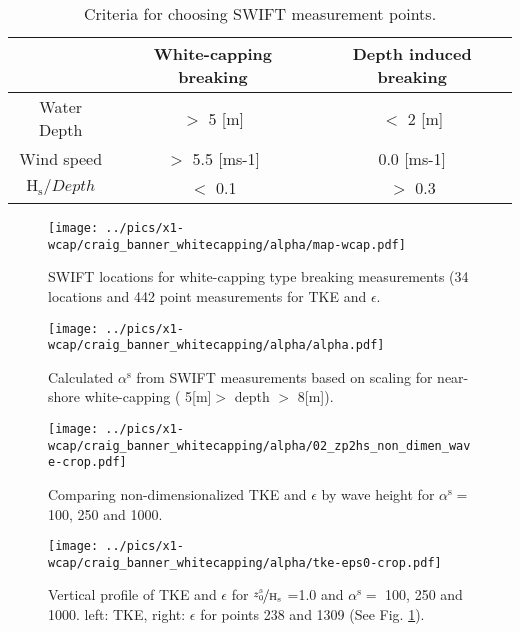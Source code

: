 \documentclass[final]{svjour3}
\begin{document}
\begin{table}
 \begin{center}
   \caption{Criteria for choosing SWIFT measurement points.}
   \label{tab:wcap_points}
   \begin{tabular}{c c c}
    \hline
        &  White-capping breaking         &  Depth induced breaking   \\ \hline 
        Water Depth      &  $>$ 5 [m]       &    $<$ 2 [m]             \\
        Wind speed       &  $>$ 5.5 [ms-1]       &    0.0 [ms-1]          \\
        $\mathrm{H}_\mathrm{s}/Depth$      &  $<$ 0.1        &    $>$ 0.3               \\ \hline
   \end{tabular}
 \end{center}
\end{table}


\begin{figure}
   \centering
   \texttt{[image: ../pics/x1-wcap/craig\_banner\_whitecapping/alpha/map-wcap.pdf]}
   \caption{SWIFT locations for white-capping type breaking measurements (34
   locations and 442 point measurements for TKE and $\epsilon$.}
   \label{fig:wcap_map}
\end{figure}


\begin{figure}
   \centering
   \texttt{[image: ../pics/x1-wcap/craig\_banner\_whitecapping/alpha/alpha.pdf]}
   \caption{Calculated $\alpha^\mathrm{s}$ from SWIFT measurements based on
   \cite{Terrayetal96} scaling for near-shore white-capping ( 5[m]$>$ depth $>$
   8[m]).
   }
   \label{fig:alpha_from_swift}
\end{figure}


\begin{figure}
   \centering
   \texttt{[image: ../pics/x1-wcap/craig\_banner\_whitecapping/alpha/02\_zp2hs\_non\_dimen\_wave-crop.pdf]}
   \caption{Comparing non-dimensionalized TKE and $\epsilon$ by wave
   height for $\alpha^\mathrm{s}=$100, 250 and 1000. }
   \label{fig:alpha_non_dimentional_compare}
\end{figure}


\begin{figure}
   \centering
   \texttt{[image: ../pics/x1-wcap/craig\_banner\_whitecapping/alpha/tke-eps0-crop.pdf]} 
   \caption{Vertical profile of TKE and $\epsilon$ for
   $\nicefrac{z_0^\mathrm{s}}{\mathrm{H}_\mathrm{s}}$ =1.0 and
   $\alpha^\mathrm{s}=$ 100, 250 and 1000. left: TKE, right: $\epsilon$ for
   points 238 and 1309 (See Fig. \ref{fig:wcap_map}).
   }  
   \label{fig:alpha_compare_profile}
\end{figure}
\end{document}
